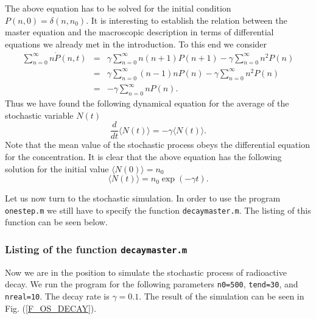 The above equation has to be solved for the initial condition
$P(n,0)= \delta(n,n_0)$. 
It is interesting to establish the
relation between the master equation and the macroscopic 
description in terms of differential equations we already met in 
the introduction.
To this end we consider
\begin{eqnarray*}
\sum_{n=0}^{\infty} n \dot{P}(n,t) &=&
       \gamma \sum_{n=0}^{\infty} n(n+1)P(n+1) 
         - \gamma  \sum_{n=0}^{\infty} n^2 P(n) \\
  &=& \gamma \sum_{n=0}^{\infty} (n-1)n P(n) 
         - \gamma  \sum_{n=0}^{\infty} n^2 P(n) \\
  & = & - \gamma \sum_{n=0}^{\infty} n P(n) .
\end{eqnarray*}
Thus we have found the following dynamical equation for the 
average of the stochastic 
variable $N(t)$
\begin{equation}
\frac{d}{dt} \langle N(t) \rangle = - \gamma \langle N(t) \rangle.
\end{equation}
Note that the mean value of the stochastic process obeys the 
differential equation for the concentration. It is clear that the 
above equation has the following solution for the initial value
$\langle N(0)\rangle = n_0$
\begin{equation*}
\langle N(t) \rangle = n_0 \exp(-\gamma t).
\end{equation*}

Let us now turn to the stochastic simulation. In order to use
the program \texttt{onestep.m} we still have to specify
the function \texttt{decaymaster.m}. The listing of this
function can be seen below.
\subsubsection{Listing of the function {\texttt{decaymaster.m}}}

Now we are in the position to simulate the stochastic process of
radioactive decay. We run the program for the following parameters
\texttt{n0=500}, \texttt{tend=30}, and \texttt{nreal=10}.
The decay rate is $\gamma=0.1$.
The result of the simulation can be seen in Fig. (\ref{F_OS_DECAY}).

